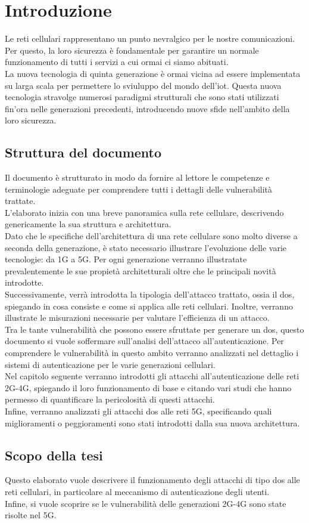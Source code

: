 \chapter{Introduzione}
Le reti cellulari rappresentano un punto nevralgico per le nostre comunicazioni.
Per questo, la loro sicurezza è fondamentale per garantire un normale funzionamento
di tutti i servizi a cui ormai ci siamo abituati.\\
La nuova tecnologia di quinta generazione è ormai vicina ad essere implementata su larga scala
per permettere lo sviuluppo del mondo dell'\gls{iot}. Questa nuova tecnologia stravolge numerosi
paradigmi strutturali che sono stati utilizzati fin'ora nelle generazioni precedenti, introducendo nuove sfide nell'ambito
della loro sicurezza.
\section{Struttura del documento}
Il documento è strutturato in modo da fornire al lettore le competenze e terminologie adeguate per comprendere tutti i dettagli delle 
vulnerabilità trattate.\\
L'elaborato inizia con una breve panoramica sulla rete cellulare, descrivendo genericamente la sua struttura e architettura.\\ 
Dato che le specifiche dell'architettura di una rete cellulare sono molto diverse a seconda della generazione, è stato 
necessario illustrare l'evoluzione delle varie tecnologie: da 1G a 5G. 
Per ogni generazione verranno illustratate prevalentemente le sue propietà architetturali oltre che le principali novità introdotte.\\
Successivamente, verrà introdotta la tipologia dell'attacco trattato, ossia il \gls{dos}, spiegando in cosa consiste
e come si applica alle reti cellulari. Inoltre, verranno illustrate le misurazioni necessarie per valutare l'efficienza di un attacco.\\
Tra le tante vulnerabilità che possono essere sfruttate per generare un \gls{dos}, questo documento si vuole soffermare sull'analisi 
dell'attacco all'autenticazione.
Per comprendere le vulnerabilità in questo ambito verranno analizzati nel dettaglio i sistemi di autenticazione per le varie generazioni cellulari.\\
Nel capitolo seguente verranno introdotti gli attacchi all'autenticazione delle reti 2G-4G, spiegando il loro funzionamento di base e citando vari studi che 
hanno permesso di quantificare la pericolosità di questi attacchi.\\
Infine, verranno analizzati gli attacchi \gls{dos} alle reti 5G, specificando quali miglioramenti o peggioramenti sono stati introdotti dalla sua nuova architettura.
\section{Scopo della tesi}
Questo elaborato vuole descrivere il funzionamento degli attacchi di tipo \gls{dos} alle reti cellulari, in particolare al meccanismo 
di autenticazione degli utenti.\\
Infine, si vuole scoprire se le vulnerabilità delle generazioni 2G-4G sono state risolte nel 5G.